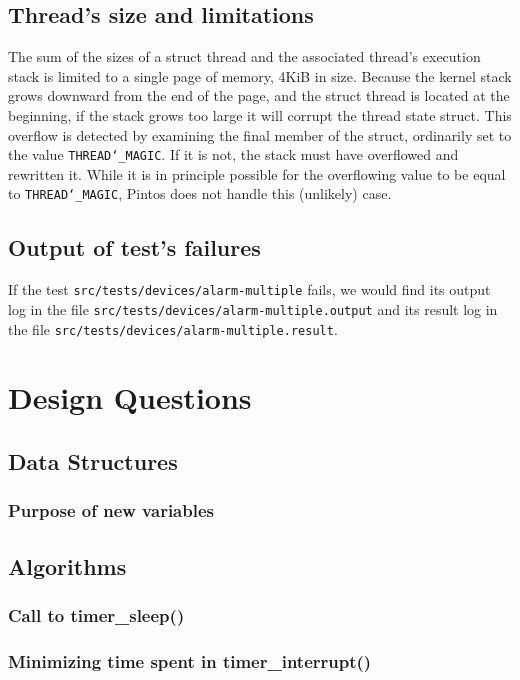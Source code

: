 \documentclass{article}
\begin{document}
\subsection{Thread's size and limitations}
The sum of the sizes of a struct thread and the associated thread's
execution stack is limited to a single page of memory, 4KiB in size.
Because the kernel stack grows downward from the end of the page, and
the struct thread is located at the beginning, if the stack grows too
large it will corrupt the thread state struct.  This overflow is
detected by examining the final member of the struct, ordinarily set
to the value \texttt{THREAD\char`_MAGIC}.  If it is not, the stack must have
overflowed and rewritten it.  While it is in principle possible for
the overflowing value to be equal to \texttt{THREAD\char`_MAGIC}, Pintos does not
handle this (unlikely) case.

\subsection{Output of test's failures}
If the test \texttt{src/tests/devices/alarm-multiple} fails, we would find its output 
log in the file \newline \texttt{src/tests/devices/alarm-multiple.output} and its result log in the 
file \newline \texttt{src/tests/devices/alarm-multiple.result}.

\section{Design Questions}
\subsection{Data Structures}
\subsubsection{Purpose of new variables}
\subsection{Algorithms}
\subsubsection{Call to timer\_sleep()}
\subsubsection{Minimizing time spent in timer\_interrupt()}
\end{document}
